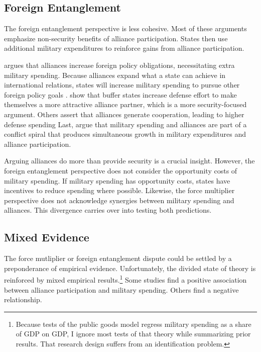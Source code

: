 \documentclass[12pt]{article}
\begin{document}
\subsection{Foreign Entanglement}


The foreign entanglement perspective is less cohesive.
Most of these arguments emphasize non-security benefits of alliance participation. 
States then use additional military expenditures to reinforce gains from alliance participation. 


\citet{Diehl1994} argues that alliances increase foreign policy obligations, necessitating extra military spending. 
Because alliances expand what a state can achieve in international relations, states will increase military spending to pursue other foreign policy goals \citep{MorganPalmer2006}. 
\citet{Horowitzetal2017} show that buffer states increase defense effort to make themselves a more attractive alliance partner, which is a more security-focused argument. 
Others assert that alliances generate cooperation, leading to higher defense spending \citep{Palmer1990, QuirozFlores2011}
Last, \citet{SeneseVasquez2008} argue that military spending and alliances are part of a conflict spiral that produces simultaneous growth in military expenditures and alliance participation. 


Arguing alliances do more than provide security is a crucial insight.
However, the foreign entanglement perspective does not consider the opportunity costs of military spending. 
If military spending has opportunity costs, states have incentives to reduce spending where possible.  
Likewise, the force multiplier perspective does not acknowledge synergies between military spending and alliances. 
This divergence carries over into testing both predictions. 


\subsection{Mixed Evidence} 


The force mutliplier or foreign entanglement dispute could be settled by a preponderance of empirical evidence. 
Unfortunately, the divided state of theory is reinforced by mixed empirical results.\footnote{Because tests of the public goods model regress military spending as a share of GDP on GDP, I ignore most tests of that theory while summarizing prior results. That research design suffers from an identification problem.}
Some studies find a positive association between alliance participation and military spending. 
Others find a negative relationship. 
\end{document}
